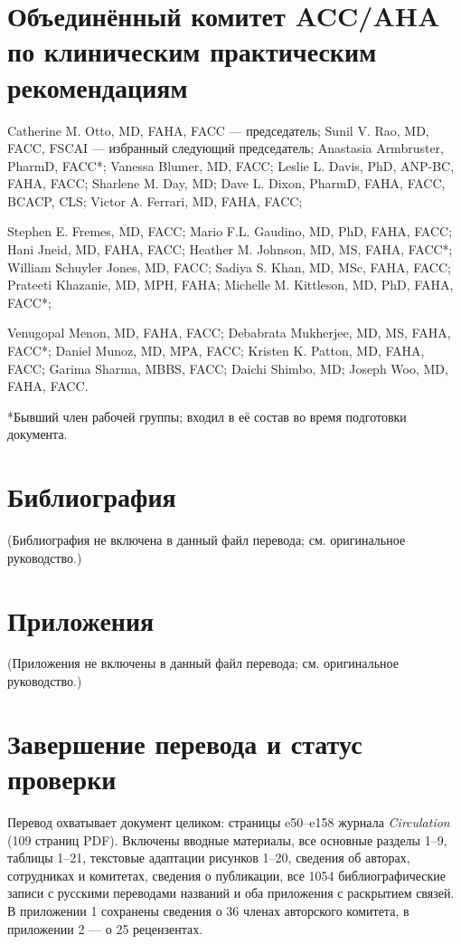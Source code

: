 \documentclass[11pt,a4paper]{article}
\begin{document}
\section*{Объединённый комитет ACC/AHA по клиническим практическим рекомендациям}
{\small
Catherine M. Otto, MD, FAHA, FACC --- председатель; Sunil V. Rao, MD, FACC, FSCAI --- избранный следующий председатель; Anastasia Armbruster, PharmD, FACC*; Vanessa Blumer, MD, FACC; Leslie L. Davis, PhD, ANP-BC, FAHA, FACC; Sharlene M. Day, MD; Dave L. Dixon, PharmD, FAHA, FACC, BCACP, CLS; Victor A. Ferrari, MD, FAHA, FACC;

Stephen E. Fremes, MD, FACC; Mario F.L. Gaudino, MD, PhD, FAHA, FACC; Hani Jneid, MD, FAHA, FACC; Heather M. Johnson, MD, MS, FAHA, FACC*; William Schuyler Jones, MD, FACC; Sadiya S. Khan, MD, MSc, FAHA, FACC; Prateeti Khazanie, MD, MPH, FAHA; Michelle M. Kittleson, MD, PhD, FAHA, FACC*;

Venugopal Menon, MD, FAHA, FACC; Debabrata Mukherjee, MD, MS, FAHA, FACC*; Daniel Munoz, MD, MPA, FACC; Kristen K. Patton, MD, FAHA, FACC; Garima Sharma, MBBS, FACC; Daichi Shimbo, MD; Joseph Woo, MD, FAHA, FACC.
}
*Бывший член рабочей группы; входил в её состав во время подготовки документа.

% 
% 

\section*{Библиография}
(Библиография не включена в данный файл перевода; см. оригинальное руководство.)

\section*{Приложения}
(Приложения не включены в данный файл перевода; см. оригинальное руководство.)

\clearpage
\section*{Завершение перевода и статус проверки}
Перевод охватывает документ целиком: страницы e50--e158 журнала \textit{Circulation} (109 страниц PDF). Включены вводные материалы, все основные разделы 1--9, таблицы 1--21, текстовые адаптации рисунков 1--20, сведения об авторах, сотрудниках и комитетах, сведения о публикации, все 1054 библиографические записи с русскими переводами названий и оба приложения с раскрытием связей. В приложении 1 сохранены сведения о 36 членах авторского комитета, в приложении 2 --- о 25 рецензентах.
\end{document}
